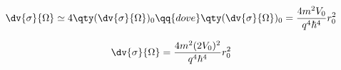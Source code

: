 \begin{soluzione}
{   \begin{equation*}
      \dv{\sigma}{\Omega}
      \simeq 4 \qty( \dv{\sigma}{\Omega} )_0
      \qq{dove}
      \qty( \dv{\sigma}{\Omega} )_0
      =\frac{4 m^2 V_0}{q^4 \hbar^4} r_0^2
   \end{equation*}

   \begin{equation*}
      \dv{\sigma}{\Omega}
      =\frac{4 m^2 (2V_0)^2}{q^4 \hbar^4} r_0^2
   \end{equation*}
   }
\end{soluzione}

\setcounter{equation}{0}
